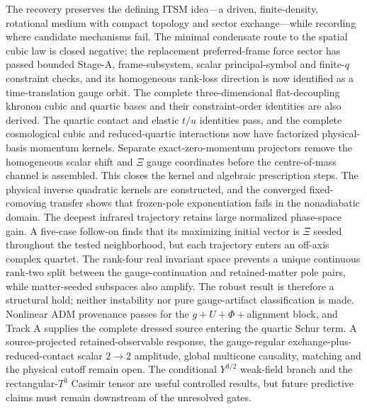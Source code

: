 ﻿\documentclass[11pt]{article}
\newcommand{\Tthree}{T^3}
\begin{document}
The recovery preserves the defining ITSM idea---a driven, finite-density,
rotational medium with compact topology and sector exchange---while recording
where candidate mechanisms fail.  The minimal condensate route to the spatial
cubic law is closed negative; the replacement preferred-frame force sector has
passed bounded Stage-A, frame-subsystem, scalar principal-symbol and finite-$q$
constraint checks, and its homogeneous rank-loss direction is now identified
as a time-translation gauge orbit.  The complete three-dimensional
flat-decoupling khronon cubic and quartic bases and their constraint-order
identities are also derived.  The quartic contact and elastic $t/u$ identities
pass, and the complete cosmological cubic and reduced-quartic interactions
now have factorized
physical-basis momentum kernels.  Separate exact-zero-momentum projectors
remove the homogeneous scalar shift and $\Xi$ gauge coordinates before the
centre-of-mass channel is assembled.  This closes the kernel and algebraic
prescription steps.  The physical inverse quadratic kernels are constructed,
and the converged fixed-comoving transfer shows that frozen-pole exponentiation
fails in the nonadiabatic domain.  The deepest infrared trajectory retains
large normalized phase-space gain.  A five-case follow-on finds that its
maximizing initial vector is $\Xi$ seeded throughout the tested neighborhood,
but each trajectory enters an off-axis complex quartet.  The rank-four real
invariant space prevents a unique continuous rank-two split between the
gauge-continuation and retained-matter pole pairs, while matter-seeded
subspaces also amplify.  The robust result is therefore a structural hold;
neither instability nor pure gauge-artifact classification is made.  Nonlinear
ADM provenance passes for the $g+U+\Phi+$alignment block, and Track A supplies
the complete dressed source entering the quartic Schur term.  A
source-projected retained-observable response, the gauge-regular
exchange-plus-reduced-contact scalar $2\to2$ amplitude, global multicone
causality, matching and the physical cutoff remain open.  The conditional
$Y^{3/2}$ weak-field branch and
the rectangular-$\Tthree$ Casimir tensor are useful controlled results, but
future predictive claims must remain downstream of the unresolved gates.


\end{document}
